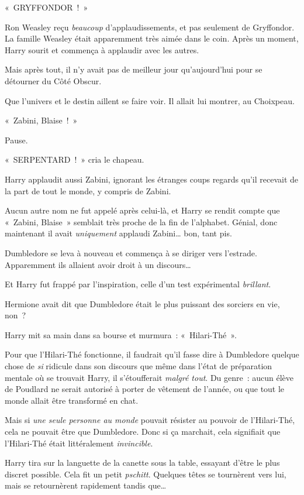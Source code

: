 «~GRYFFONDOR~!~»

Ron Weasley reçu \emph{beaucoup} d'applaudissements, et pas seulement de Gryffondor.
La famille Weasley était apparemment très aimée dans le coin.
Après un moment, Harry sourit et commença à applaudir avec les autres.

Mais après tout, il n'y avait pas de meilleur jour qu'aujourd'hui pour se détourner du Côté Obscur.

Que l'univers et le destin aillent se faire voir.
Il allait lui montrer, au Choixpeau.

«~Zabini, Blaise~!~»

Pause.

«~SERPENTARD~!~» cria le chapeau.

Harry applaudit aussi Zabini, ignorant les étranges coups regards qu'il recevait de la part de tout le monde, y compris de Zabini.

Aucun autre nom ne fut appelé après celui-là, et Harry se rendit compte que «~Zabini, Blaise~» semblait très proche de la fin de l'alphabet.
Génial, donc maintenant il avait \emph{uniquement} applaudi Zabini… bon, tant pis.

Dumbledore se leva à nouveau et commença à se diriger vers l'estrade.
Apparemment ils allaient avoir droit à un discours…

Et Harry fut frappé par l'inspiration, celle d'un test expérimental \emph{brillant}.

Hermione avait dit que Dumbledore était le plus puissant des sorciers en vie, non~?

Harry mit sa main dans sa bourse et murmura~: «~Hilari-Thé~».

Pour que l'Hilari-Thé fonctionne, il faudrait qu'il fasse dire à Dumbledore quelque chose de \emph{si} ridicule dans son discours que même dans l'état de préparation mentale où se trouvait Harry, il s'étoufferait \emph{malgré tout}.
Du genre~: aucun élève de Poudlard ne serait autorisé à porter de vêtement de l'année, ou que tout le monde allait être transformé en chat.

Mais si \emph{une seule personne au monde} pouvait résister au pouvoir de l'Hilari-Thé, cela ne pouvait être que Dumbledore.
Donc si ça marchait, cela signifiait que l'Hilari-Thé était littéralement \emph{invincible}.

Harry tira sur la languette de la canette sous la table, essayant d'être le plus discret possible.
Cela fit un petit \emph{pschitt}.
Quelques têtes se tournèrent vers lui, mais se retournèrent rapidement tandis que…


